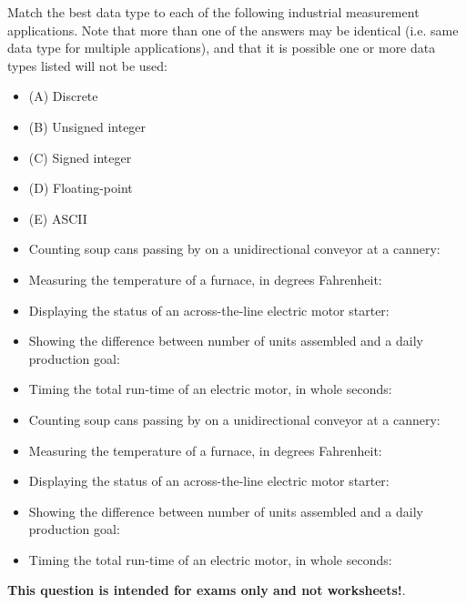 

Match the best data type to each of the following industrial measurement applications.  Note that more than one of the answers may be identical (i.e. same data type for multiple applications), and that it is possible one or more data types listed will not be used:

\begin{itemize}
\item{} (A) Discrete
\item{} (B) Unsigned integer
\item{} (C) Signed integer
\item{} (D) Floating-point
\item{} (E) ASCII
\end{itemize}

\begin{itemize}
\item{} Counting soup cans passing by on a unidirectional conveyor at a cannery: \underbar{\hskip 50pt}
\vskip 10pt
\item{} Measuring the temperature of a furnace, in degrees Fahrenheit: \underbar{\hskip 50pt}
\vskip 10pt
\item{} Displaying the status of an across-the-line electric motor starter: \underbar{\hskip 50pt}
\vskip 10pt
\item{} Showing the difference between number of units assembled and a daily production goal: \underbar{\hskip 50pt}
\vskip 10pt
\item{} Timing the total run-time of an electric motor, in whole seconds: \underbar{\hskip 50pt}
\end{itemize}







\begin{itemize}
\item{} Counting soup cans passing by on a unidirectional conveyor at a cannery: 
\vskip 10pt
\item{} Measuring the temperature of a furnace, in degrees Fahrenheit: 
\vskip 10pt
\item{} Displaying the status of an across-the-line electric motor starter: 
\vskip 10pt
\item{} Showing the difference between number of units assembled and a daily production goal: 
\vskip 10pt
\item{} Timing the total run-time of an electric motor, in whole seconds: 
\end{itemize}








{\bf This question is intended for exams only and not worksheets!}.


